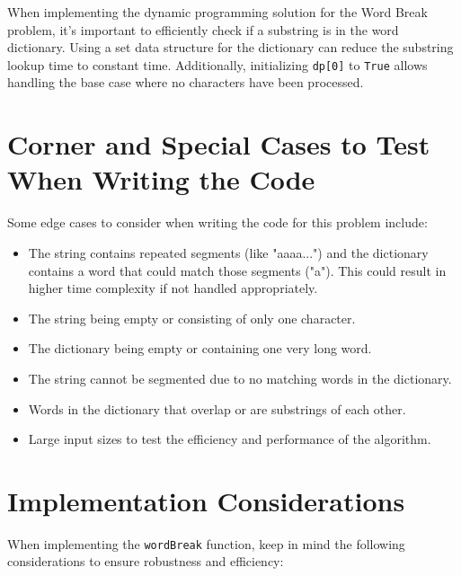 When implementing the dynamic programming solution for the Word Break problem, it's important to efficiently check if a substring is in the word dictionary. Using a set data structure for the dictionary can reduce the substring lookup time to constant time. Additionally, initializing \texttt{dp[0]} to \texttt{True} allows handling the base case where no characters have been processed.


\section*{Corner and Special Cases to Test When Writing the Code}

Some edge cases to consider when writing the code for this problem include:

\begin{itemize}
    \item The string contains repeated segments (like "aaaa...") and the dictionary contains a word that could match those segments ("a"). This could result in higher time complexity if not handled appropriately.
    \item The string being empty or consisting of only one character.
    \item The dictionary being empty or containing one very long word.
    \item The string cannot be segmented due to no matching words in the dictionary.
    \item Words in the dictionary that overlap or are substrings of each other.
    \item Large input sizes to test the efficiency and performance of the algorithm.
\end{itemize}

\section*{Implementation Considerations}

When implementing the \texttt{wordBreak} function, keep in mind the following considerations to ensure robustness and efficiency:

